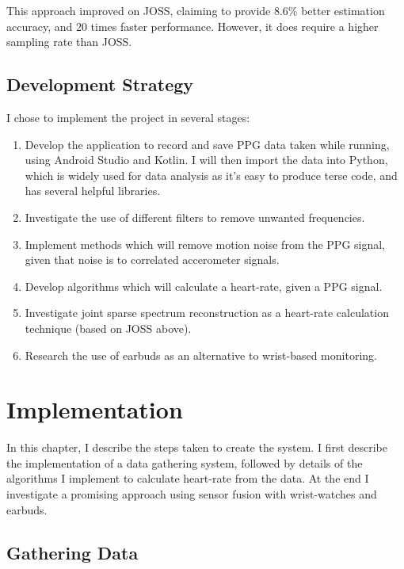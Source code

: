 \documentclass[12pt,a4paper,twoside,openright]{report}
\begin{document}
This approach improved on JOSS, claiming to provide 8.6\% better estimation
accuracy, and 20 times faster performance. However, it does require a higher
sampling rate than JOSS.



\section{Development Strategy}

I chose to implement the project in several stages:

\begin{enumerate}
	\item Develop the application to record and save PPG data taken while
		running, using Android Studio and Kotlin. I will then import the data
		into Python, which is widely used for data analysis as it's
		easy to produce terse code, and has several helpful
		libraries.

	\item Investigate the use of different filters to remove unwanted frequencies.

	\item Implement methods which will remove motion noise from the PPG
		signal, given that noise is to correlated accerometer signals.

	\item Develop algorithms which will calculate a heart-rate, given a
		PPG signal.

	\item Investigate joint sparse spectrum reconstruction as a heart-rate
		calculation technique (based on JOSS above).

	\item Research the use of earbuds as an alternative to wrist-based
		monitoring.

\end{enumerate}


\chapter{Implementation}

In this chapter, I describe the steps taken to create the system. I first
describe the implementation of a data gathering system, followed by details of
the algorithms I implement to calculate heart-rate from the data. At the end
I investigate a promising approach using sensor fusion with 
wrist-watches and earbuds.

\section{Gathering Data}
\end{document}
